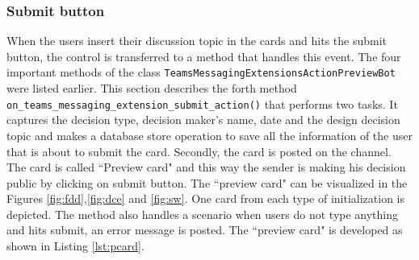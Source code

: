 \subsubsection{\textbf{Submit button}} 
When the users insert their discussion topic in the cards and hits the submit button, the control is transferred to a method that handles this event. The four important methods of the class \texttt{TeamsMessagingExtensionsActionPreviewBot} were listed earlier. This section describes the forth method \texttt{on\_teams\_messaging\_extension\_submit\_action()} that performs two tasks. It captures the decision type, decision maker's name, date and the design decision topic and makes a database store operation to save all the information of the user that is about to submit the card. Secondly, the card is posted on the channel. The card is called ``Preview card" and this way the sender is making his decision public by clicking on submit button. The ``preview card" can be visualized in the Figures \ref{fig:fdd},\ref{fig:dce} and \ref{fig:sw}. One card from each type of initialization is depicted. The method also handles a scenario when users do not type anything and hits submit, an error message is posted. The ``preview card" is developed as shown in Listing \ref{lst:pcard}. 

